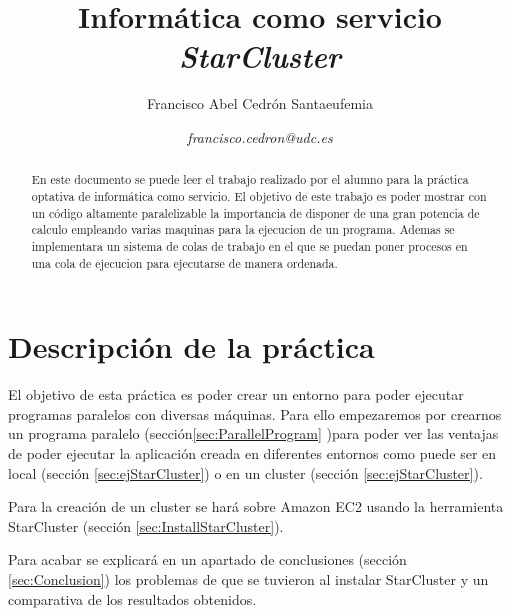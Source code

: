\documentclass{article}
\title{\textbf{Informática como servicio}
\\ \textbf{\emph{StarCluster}}
}
\author{Francisco Abel Cedrón Santaeufemia \and \textit{francisco.cedron@udc.es}}
\date{} %
\begin{document}
\maketitle %
\renewcommand{\abstractname}{Abstract} %
\begin{abstract}
	En este documento se puede leer el trabajo realizado por el alumno para la práctica optativa de informática como servicio. El objetivo de este trabajo es poder mostrar con un código altamente paralelizable la importancia de disponer de una gran potencia de calculo empleando varias maquinas para la ejecucion de un programa. Ademas se implementara un sistema de colas de trabajo en el que se puedan poner procesos en una cola de ejecucion para ejecutarse de manera ordenada.
\end{abstract}
\renewcommand{\contentsname}{} %
{\setlength{\parskip}{0mm} \tableofcontents} %

\section{Descripción de la práctica}
	El objetivo de esta práctica es poder crear un entorno para poder ejecutar programas paralelos con diversas máquinas. Para ello empezaremos por crearnos un programa paralelo (sección\ref{sec:ParallelProgram} )para poder ver las ventajas de poder ejecutar la aplicación creada en diferentes entornos como puede ser en local (sección \ref{sec:ejStarCluster}) o en un cluster (sección \ref{sec:ejStarCluster}).
	
	Para la creación de un cluster se hará sobre Amazon EC2 usando la herramienta StarCluster (sección \ref{sec:InstallStarCluster}).
	
	Para acabar se explicará en un apartado de conclusiones (sección \ref{sec:Conclusion}) los problemas de que se tuvieron al instalar StarCluster y un comparativa de los resultados obtenidos.
	
\end{document}
